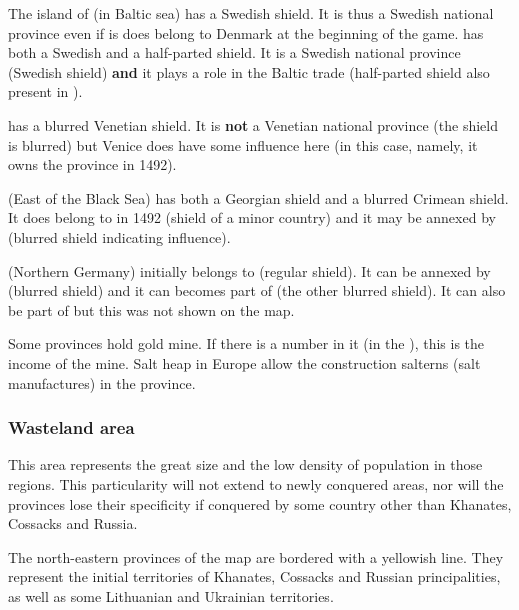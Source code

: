 \begin{exemple}[Shields]
  The island of \provinceGotland (in Baltic sea) has a Swedish shield. It is
  thus a Swedish national province even if is does belong to Denmark at the
  beginning of the game. \provinceSkane has both a Swedish and a half-parted
  shield. It is a Swedish national province (Swedish shield) \textbf{and} it
  plays a role in the Baltic trade (half-parted shield also present in
  \seazoneBaltique).

  \provinceKreta has a blurred Venetian shield. It is \textbf{not} a Venetian
  national province (the shield is blurred) but Venice does have some
  influence here (in this case, namely, it owns the province in 1492).

  \provinceKuban (East of the Black Sea) has both a Georgian shield and a
  blurred Crimean shield. It does belong to \paysGeorgie in 1492 (shield of a
  minor country) and it may be annexed by \paysCrimee (blurred shield
  indicating influence).

  \provinceHinterpommern (Northern Germany) initially belongs to
   (regular shield). It can be annexed by \paysHanse
  (blurred shield) and it can becomes part of  (the
  other blurred shield). It can also be part of \paysPommeranie but this was
  not shown on the map.
\end{exemple}

 Some provinces hold gold mine. If there is a number in it
(in the \ROTW), this is the income of the mine.
 Salt heap in Europe allow the construction salterns
(salt manufactures) in the province.%


\subsubsection{Wasteland area}\label{chBasics:Wasteland}
\begin{histoire}
  This area represents the great size and the low density of population in
  those regions. This particularity will not extend to newly conquered areas,
  nor will the provinces lose their specificity if conquered by some country
  other than Khanates, Cossacks and Russia.
\end{histoire}
 The north-eastern provinces of the map are
bordered with a yellowish line. They represent the initial territories of
Khanates, Cossacks and Russian principalities, as well as some Lithuanian and
Ukrainian territories.


